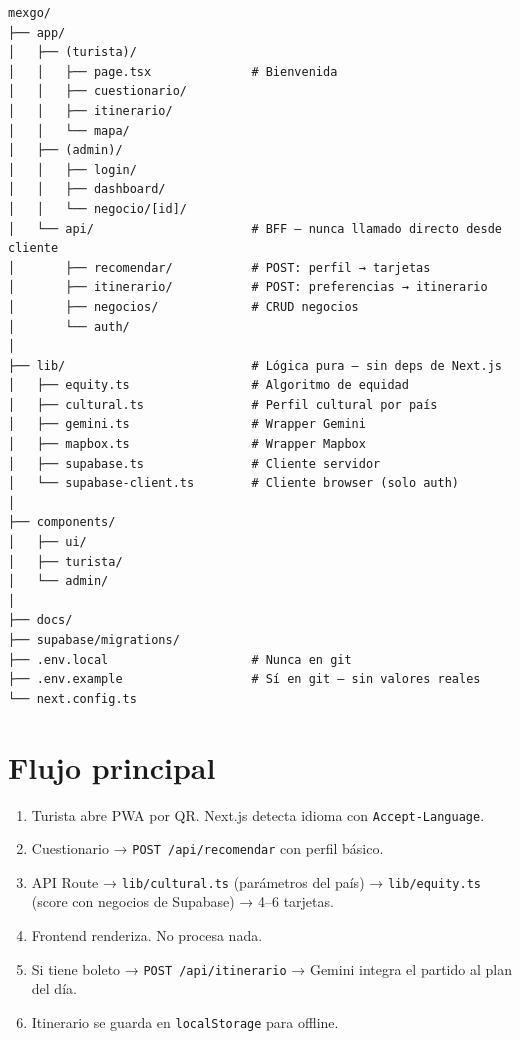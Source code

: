 \documentclass[11pt,a4paper]{article}
\newcommand{\f}[1]{\texttt{\textcolor{d}{#1}}}
\begin{document}
\begin{verbatim}
mexgo/
├── app/
│   ├── (turista)/
│   │   ├── page.tsx              # Bienvenida
│   │   ├── cuestionario/
│   │   ├── itinerario/
│   │   └── mapa/
│   ├── (admin)/
│   │   ├── login/
│   │   ├── dashboard/
│   │   └── negocio/[id]/
│   └── api/                      # BFF — nunca llamado directo desde cliente
│       ├── recomendar/           # POST: perfil → tarjetas
│       ├── itinerario/           # POST: preferencias → itinerario
│       ├── negocios/             # CRUD negocios
│       └── auth/
│
├── lib/                          # Lógica pura — sin deps de Next.js
│   ├── equity.ts                 # Algoritmo de equidad
│   ├── cultural.ts               # Perfil cultural por país
│   ├── gemini.ts                 # Wrapper Gemini
│   ├── mapbox.ts                 # Wrapper Mapbox
│   ├── supabase.ts               # Cliente servidor
│   └── supabase-client.ts        # Cliente browser (solo auth)
│
├── components/
│   ├── ui/
│   ├── turista/
│   └── admin/
│
├── docs/
├── supabase/migrations/
├── .env.local                    # Nunca en git
├── .env.example                  # Sí en git — sin valores reales
└── next.config.ts
\end{verbatim}

\section{Flujo principal}

\begin{enumerate}[leftmargin=*, itemsep=2pt]
  \item Turista abre PWA por QR. Next.js detecta idioma con
        \texttt{Accept-Language}.
  \item Cuestionario → \texttt{POST /api/recomendar} con perfil básico.
  \item API Route → \f{lib/cultural.ts} (parámetros del país) →
        \f{lib/equity.ts} (score con negocios de Supabase) → 4--6 tarjetas.
  \item Frontend renderiza. No procesa nada.
  \item Si tiene boleto → \texttt{POST /api/itinerario} → Gemini integra
        el partido al plan del día.
  \item Itinerario se guarda en \texttt{localStorage} para offline.
\end{enumerate}
\end{document}
